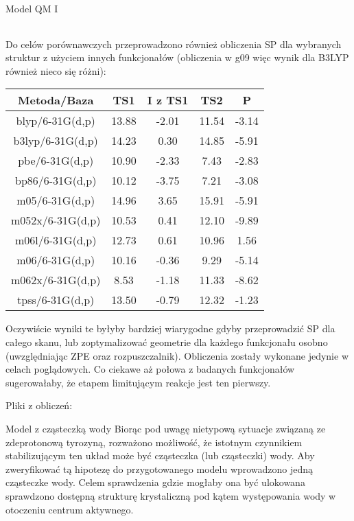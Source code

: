 \begin{section}{Model QM I}
\begin{tabular}{||c c c c c c||}
\end{tabular}
 
 Do celów porównawczych przeprowadzono również obliczenia SP dla wybranych struktur z użyciem innych funkcjonałów (obliczenia w g09 więc wynik dla B3LYP również nieco się różni):
 
   \begin{tabular}{||c c c c  c||} 
 \hline
 Metoda/Baza & TS1 & I z TS1 & TS2 & P \\ [0.5ex] 
 \hline\hline
blyp/6-31G(d,p) & 13.88 & -2.01 & 11.54 & -3.14  \\
b3lyp/6-31G(d,p) & 14.23 &  0.30 & 14.85 & -5.91  \\
pbe/6-31G(d,p) & 10.90 & -2.33  & 7.43 & -2.83  \\
bp86/6-31G(d,p) & 10.12 & -3.75  & 7.21 & -3.08  \\
m05/6-31G(d,p) & 14.96 &  3.65 & 15.91 & -5.91  \\
m052x/6-31G(d,p) & 10.53 &  0.41 & 12.10 & -9.89  \\
m06l/6-31G(d,p) & 12.73 & 0.61  & 10.96 & 1.56  \\
m06/6-31G(d,p) & 10.16 &  -0.36 & 9.29 & -5.14  \\
m062x/6-31G(d,p) & 8.53 &  -1.18 & 11.33 & -8.62  \\
tpss/6-31G(d,p) & 13.50 & -0.79  & 12.32 & -1.23  \\
 \hline
 
\end{tabular}
 
 Oczywiście wyniki te byłyby bardziej wiarygodne gdyby przeprowadzić SP dla całego skanu, lub zoptymalizować geometrie dla każdego funkcjonału osobno (uwzględniając ZPE oraz
 rozpuszczalnik). Obliczenia zostały wykonane jedynie
 w celach poglądowych. Co ciekawe aż połowa z badanych funkcjonałów sugerowałaby, że etapem limitującym reakcje jest ten pierwszy. 
 
 Pliki z obliczeń:
 
 \begin{subsection}{Model z cząsteczką wody}
  Biorąc pod uwagę nietypową sytuacje związaną ze zdeprotonową tyrozyną, rozważono możliwość, że istotnym czynnikiem stabilizującym
  ten układ może być cząsteczka (lub cząsteczki) wody. Aby zweryfikować tą hipotezę do przygotowanego modelu wprowadzono jedną
  cząsteczke wody. Celem sprawdzenia gdzie mogłaby ona być ulokowana sprawdzono dostępną strukturę krystaliczną pod kątem
  występowania wody w otoczeniu centrum aktywnego.
  

\end{subsection}
\end{section}
